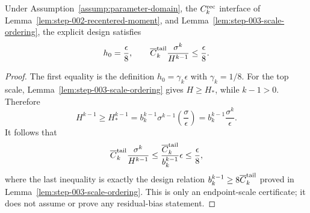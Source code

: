\begin{lemma}\label{lem:step-003-endpoint-calibration}
Under Assumption~\ref{assump:parameter-domain}, the \(C_k^{\rm rec}\) interface of
Lemma~\ref{lem:step-002-recentered-moment}, and
Lemma~\ref{lem:step-003-scale-ordering}, the explicit design satisfies
\[
h_0=\frac{\epsilon}{8},
\qquad
\overline C_k^{\rm tail}\frac{\sigma^k}{H^{k-1}}
\leq\frac{\epsilon}{8}.
\]
\end{lemma}

\begin{proof}
The first equality is the definition
\(h_0=\gamma_k\epsilon\) with \(\gamma_k=1/8\). For the top scale,
Lemma~\ref{lem:step-003-scale-ordering} gives \(H\geq H_*\), while
\(k-1>0\). Therefore
\[
H^{k-1}\geq H_*^{k-1}
=b_k^{k-1}\sigma^{k-1}
  \left(\frac{\sigma}{\epsilon}\right)
=b_k^{k-1}\frac{\sigma^k}{\epsilon}.
\]
It follows that
\[
\overline C_k^{\rm tail}\frac{\sigma^k}{H^{k-1}}
\leq\frac{\overline C_k^{\rm tail}}{b_k^{k-1}}\epsilon
\leq\frac\epsilon8,
\]
where the last inequality is exactly the design relation
\(b_k^{k-1}\geq8\overline C_k^{\rm tail}\) proved in
Lemma~\ref{lem:step-003-scale-ordering}. This is only an endpoint-scale
certificate; it does not assume or prove any residual-bias statement.
\end{proof}

